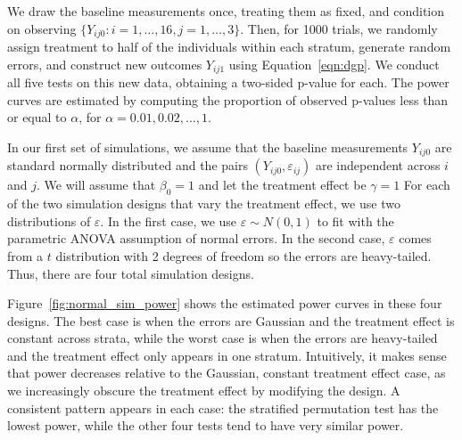 \documentclass[11pt]{article}
\begin{document}
\noindent We draw the baseline measurements once, treating them as fixed, and condition on observing $\{ Y_{ij0} : {i = 1,\dots,16, j = 1,\dots, 3}\}$.
Then, for 1000 trials, we randomly assign treatment to half of the individuals within each stratum, generate random errors, and construct new outcomes $Y_{ij1}$ using Equation~\ref{eqn:dgp}.
We conduct all five tests on this new data, obtaining a two-sided p-value for each.
The power curves are estimated by computing the proportion of observed p-values less than or equal to $\alpha$, for $\alpha = 0.01, 0.02, \dots, 1$.

In our first set of simulations, we assume that the baseline measurements $Y_{ij0}$ are standard normally distributed and the pairs $(Y_{ij0}, \varepsilon_{ij})$ are independent across $i$ and $j$.
We will assume that $\beta_0 = 1$ and let the treatment effect be $\gamma = 1$
For each of the two simulation designs that vary the treatment effect, we use two distributions of $\varepsilon$.
In the first case, we use $\varepsilon \sim N(0, 1)$ to fit with the parametric ANOVA assumption of normal errors.
In the second case, $\varepsilon$ comes from a $t$ distribution with 2 degrees of freedom so the errors are heavy-tailed.
Thus, there are four total simulation designs.

Figure~\ref{fig:normal_sim_power} shows the estimated power curves in these four designs.
The best case is when the errors are Gaussian and the treatment effect is constant across strata, while the worst case is when the errors are heavy-tailed and the treatment effect only appears in one stratum.
Intuitively, it makes sense that power decreases relative to the Gaussian, constant treatment effect case, as we increasingly obscure the treatment effect by modifying the design.
A consistent pattern appears in each case: the stratified permutation test has the lowest power, while the other four tests tend to have very similar power.
\end{document}
